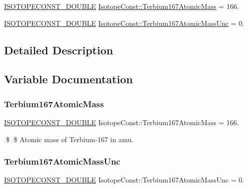 \begin{DoxyCompactItemize}
\item 
\mbox{\hyperlink{group___isotope_const-_macros_ga8f45a7272ce02c0b4c65c44636ed719a}{I\+S\+O\+T\+O\+P\+E\+C\+O\+N\+S\+T\+\_\+\+D\+O\+U\+B\+LE}} \mbox{\hyperlink{group___isotope_const-_terbium-_tb167_ga0064c08259eab605b22ac383006c3531}{Isotope\+Const\+::\+Terbium167\+Atomic\+Mass}} = 166.
\item 
\mbox{\hyperlink{group___isotope_const-_macros_ga8f45a7272ce02c0b4c65c44636ed719a}{I\+S\+O\+T\+O\+P\+E\+C\+O\+N\+S\+T\+\_\+\+D\+O\+U\+B\+LE}} \mbox{\hyperlink{group___isotope_const-_terbium-_tb167_gaf89e117321999dfad40186efabc5bf37}{Isotope\+Const\+::\+Terbium167\+Atomic\+Mass\+Unc}} = 0.
\end{DoxyCompactItemize}


\subsection{Detailed Description}


\subsection{Variable Documentation}
\mbox{\label{group___isotope_const-_terbium-_tb167_ga0064c08259eab605b22ac383006c3531}} 
\subsubsection{\texorpdfstring{Terbium167\+Atomic\+Mass}{Terbium167AtomicMass}}
{\footnotesize\ttfamily \mbox{\hyperlink{group___isotope_const-_macros_ga8f45a7272ce02c0b4c65c44636ed719a}{I\+S\+O\+T\+O\+P\+E\+C\+O\+N\+S\+T\+\_\+\+D\+O\+U\+B\+LE}} Isotope\+Const\+::\+Terbium167\+Atomic\+Mass = 166.}

\$ \$ Atomic mass of Terbium-\/167 in amu. \mbox{\label{group___isotope_const-_terbium-_tb167_gaf89e117321999dfad40186efabc5bf37}} 
\subsubsection{\texorpdfstring{Terbium167\+Atomic\+Mass\+Unc}{Terbium167AtomicMassUnc}}
{\footnotesize\ttfamily \mbox{\hyperlink{group___isotope_const-_macros_ga8f45a7272ce02c0b4c65c44636ed719a}{I\+S\+O\+T\+O\+P\+E\+C\+O\+N\+S\+T\+\_\+\+D\+O\+U\+B\+LE}} Isotope\+Const\+::\+Terbium167\+Atomic\+Mass\+Unc = 0.}

